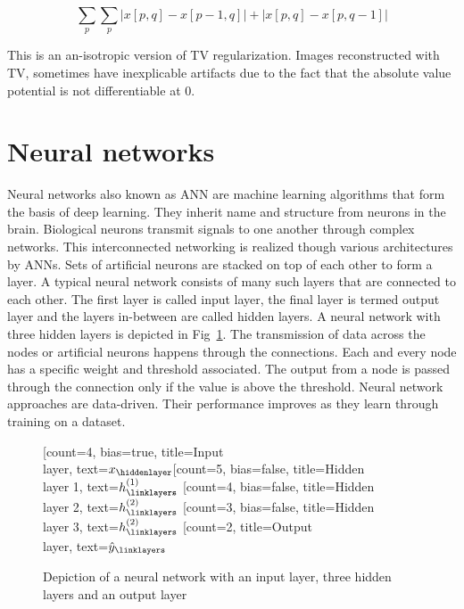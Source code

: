 \begin{equation}
\sum_{p} \sum_{p}|x[p, q]-x[p-1, q]|+|x[p, q]-x[p, q-1]|
\end{equation}    

This is an an-isotropic version of \ac{TV} regularization. Images reconstructed with \ac{TV}, sometimes have inexplicable artifacts due to the fact that the absolute value potential is not differentiable at $0$. 

\section{Neural networks}

Neural networks also known as \ac{ANN} are machine learning algorithms that form the basis of deep learning. They inherit name and structure from neurons in the brain. Biological neurons transmit signals to one another through complex networks. This interconnected networking is realized though various architectures by \ac{ANN}s. Sets of artificial neurons are stacked on top of each other to form a layer. A typical neural network consists of many such layers that are connected to each other. The first layer is called input layer, the final layer is termed output layer and the layers in-between are called hidden layers. A neural network with three hidden layers is depicted in Fig~\ref{fig:nn}. The transmission of data across the nodes or artificial neurons happens through the connections. Each and every node has a specific weight and threshold associated. The output from a node is passed through the connection only if the value is above the threshold. Neural network approaches are data-driven. Their performance improves as they learn through training on a dataset. 

\begin{figure}
	\centering
\begin{neuralnetwork}[height=5]
	\newcommand{\x}[2]{$x_#2$}
	\newcommand{\y}[2]{$\hat{y}_#2$}
	\newcommand{\hfirst}[2]{\small $h^{(1)}_#2$}
	\newcommand{\hsecond}[2]{\small $h^{(2)}_#2$}
	[count=4, bias=true, title=Input\\layer, text=\x]
	\hiddenlayer[count=5, bias=false, title=Hidden\\layer 1, text=\hfirst] \linklayers
	\hiddenlayer[count=4, bias=false, title=Hidden\\layer 2, text=\hsecond] \linklayers
	\hiddenlayer[count=3, bias=false, title=Hidden\\layer 3, text=\hsecond] \linklayers
	\outputlayer[count=2, title=Output\\layer, text=\y] \linklayers
\end{neuralnetwork}
\caption{Depiction of a neural network with an input layer, three hidden layers and an output layer}\label{fig:nn}
\end{figure}


